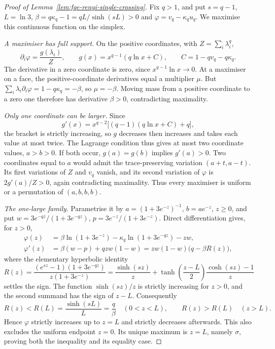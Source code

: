 \begin{proof}[Proof of Lemma~\ref{lem:fqe-renyi-single-crossing}]
Fix $q>1$, and put $s=q-1$, $L=\ln3$, $\beta=q\kappa_q-1=qL/\sinh(sL)>0$ and
$\varphi=v_q-\kappa_qu_q$. We maximise this continuous function on the simplex.

\emph{A maximiser has full support.} On the positive coordinates, with $Z=\sum_i\lambda_i^q$,
\[
 \partial_i\varphi=\frac{g(\lambda_i)}Z,\qquad
 g(x)=x^{q-1}(q\ln x+C),\qquad C=1-qv_q-q\kappa_q.
\]
The derivative in a zero coordinate is zero, since $x^{q-1}\ln x\to0$.
At a maximiser on a face, the positive-coordinate derivatives equal a multiplier $\mu$.
But $\sum_i\lambda_i\partial_i\varphi=1-q\kappa_q=-\beta$, so $\mu=-\beta$.
Moving mass from a positive coordinate to a zero one therefore has derivative $\beta>0$,
contradicting maximality.

\emph{Only one coordinate can be larger.} Since
\[
 g'(x)=x^{q-2}\bigl[(q-1)(q\ln x+C)+q\bigr],
\]
the bracket is strictly increasing, so $g$ decreases then increases and takes each value at most twice.
The Lagrange condition thus gives at most two coordinate values, $a>b>0$.
If both occur, $g(a)=g(b)$ implies $g'(a)>0$.
Two coordinates equal to $a$ would admit the trace-preserving variation $(a+t,a-t)$.
Its first variations of $Z$ and $v_q$ vanish, and its second variation of $\varphi$ is
$2g'(a)/Z>0$, again contradicting maximality.
Thus every maximiser is uniform or a permutation of $(a,b,b,b)$.

\emph{The one-large family.} Parametrise it by
$a=(1+3e^{-z})^{-1}$, $b=ae^{-z}$, $z\ge0$, and put
$w=3e^{-qz}/(1+3e^{-qz})$, $p=3e^{-z}/(1+3e^{-z})$.
Direct differentiation gives, for $z>0$,
\[
 \begin{aligned}
 \varphi(z)&=\beta\ln(1+3e^{-z})-\kappa_q\ln(1+3e^{-qz})-zw,\\
 \varphi'(z)&=\beta(w-p)+qzw(1-w)
             =zw(1-w)\bigl(q-\beta R(z)\bigr),
 \end{aligned}
\]
where the elementary hyperbolic identity
\[
 R(z)=\frac{(e^{sz}-1)(1+3e^{-qz})}{z(1+3e^{-z})}
     =\frac{\sinh(sz)}z+
       \tanh\!\left(\frac{z-L}{2}\right)\frac{\cosh(sz)-1}z
 \tag{SR}\label{eq:fqe-renyi-crossing-ratio}
\]
settles the sign. The function $\sinh(sz)/z$ is strictly increasing for $z>0$,
and the second summand has the sign of $z-L$. Consequently
\[
 R(z)<R(L)=\frac{\sinh(sL)}L=\frac q\beta\quad(0<z<L),\qquad
 R(z)>R(L)\quad(z>L).
\]
Hence $\varphi$ strictly increases up to $z=L$ and strictly decreases afterwards.
This also excludes the uniform endpoint $z=0$.
Its unique maximum is $z=L$, namely $\sigma$, proving both the inequality and its equality case.
\end{proof}
